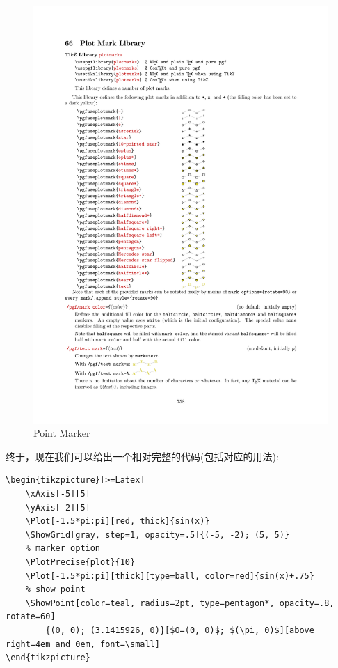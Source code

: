 \begin{figure}
    \centering
    \includegraphics[width=.95\linewidth]{./pics/point_marker.pdf}
    \caption{Point Marker}
    \label{fig:point-marker}
\end{figure}

终于，现在我们可以给出一个相对完整的代码(包括对应的用法):

\begin{verbatim}
\begin{tikzpicture}[>=Latex]
    \xAxis[-5][5]
    \yAxis[-2][5]
    \Plot[-1.5*pi:pi][red, thick]{sin(x)}
    \ShowGrid[gray, step=1, opacity=.5]{(-5, -2); (5, 5)}
    % marker option
    \PlotPrecise{plot}{10}
    \Plot[-1.5*pi:pi][thick][type=ball, color=red]{sin(x)+.75}
    % show point
    \ShowPoint[color=teal, radius=2pt, type=pentagon*, opacity=.8, rotate=60]
        {(0, 0); (3.1415926, 0)}[$O=(0, 0)$; $(\pi, 0)$][above right=4em and 0em, font=\small]
\end{tikzpicture}
\end{verbatim}

